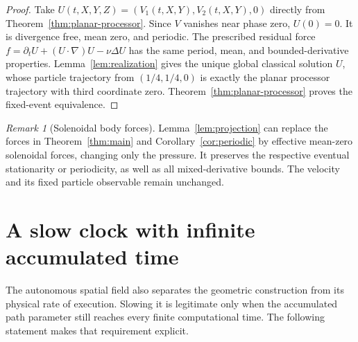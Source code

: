 \documentclass[11pt]{article}
\theoremstyle{remark}\newtheorem{remark}[theorem]{Remark}
\begin{document}
\begin{proof}
Take $U(t,X,Y,Z)=(V_1(t,X,Y),V_2(t,X,Y),0)$ directly from
Theorem~\ref{thm:planar-processor}.  Since $V$ vanishes near phase zero,
$U(0)=0$.  It is divergence free, mean zero, and periodic.  The
prescribed residual force
$f=\partial_tU+(U\cdot\nabla)U-\nu\Delta U$ has the same period,
mean, and bounded-derivative properties.  Lemma~\ref{lem:realization}
gives the unique global classical solution $U$, whose particle
trajectory from $(1/4,1/4,0)$ is exactly the planar processor trajectory
with third coordinate zero.  Theorem~\ref{thm:planar-processor} proves the
fixed-event equivalence.
\end{proof}

\begin{remark}[Solenoidal body forces]
Lemma~\ref{lem:projection} can replace the forces in
Theorem~\ref{thm:main} and Corollary~\ref{cor:periodic} by
effective mean-zero solenoidal forces, changing only the pressure.
It preserves the respective eventual stationarity or periodicity,
as well as all mixed-derivative bounds.  The velocity and its fixed
particle observable remain unchanged.
\end{remark}


\section{A slow clock with infinite accumulated time}\label{sec:profiles}
The autonomous spatial field also separates the geometric construction
from its physical rate of execution. Slowing it is legitimate only when
the accumulated path parameter still reaches every finite computational
time. The following statement makes that requirement explicit.
\end{document}

